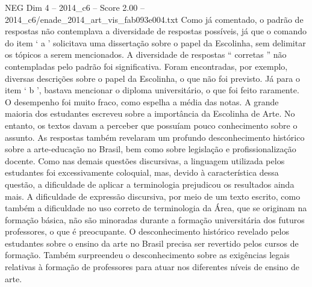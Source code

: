 \begin{textsample}{NEG Dim 4 – 2014\_c6 – Score 2.00 – 2014\_c6/enade\_2014\_art\_vis\_fab093e004.txt}
Como já comentado, o padrão de respostas não contemplava a diversidade de respostas possíveis, já que o comando do item ‘ a ’ solicitava uma dissertação sobre o papel da Escolinha, sem delimitar os tópicos a serem mencionados.
A diversidade de respostas “ corretas ” não contempladas pelo padrão foi significativa.
Foram encontradas, por exemplo, diversas descrições sobre o papel da Escolinha, o que não foi previsto.
Já para o item ‘ b ’, bastava mencionar o diploma universitário, o que foi feito raramente.
O desempenho foi muito fraco, como espelha a média das notas.
A grande maioria dos estudantes escreveu sobre a importância da Escolinha de Arte.
No entanto, os textos davam a perceber que possuíam pouco conhecimento sobre o assunto.
As respostas também revelaram um profundo desconhecimento histórico sobre a arte-educação no Brasil, bem como sobre legislação e profissionalização docente.
Como nas demais questões discursivas, a linguagem utilizada pelos estudantes foi excessivamente coloquial, mas, devido à característica dessa questão, a dificuldade de aplicar a terminologia prejudicou os resultados ainda mais.
A dificuldade de expressão discursiva, por meio de um texto escrito, como também a dificuldade no uso correto de terminologia da Área, que se originam na formação básica, não são minoradas durante a formação universitária dos futuros professores, o que é preocupante.
O desconhecimento histórico revelado pelos estudantes sobre o ensino da arte no Brasil precisa ser revertido pelos cursos de formação.
Também surpreendeu o desconhecimento sobre as exigências legais relativas à formação de professores para atuar nos diferentes níveis de ensino de arte.

\end{textsample}
